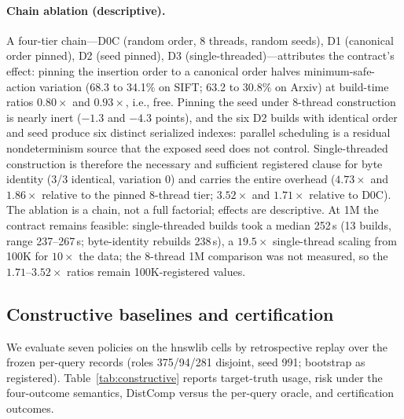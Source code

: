 \documentclass{article}
\begin{document}
\paragraph{Chain ablation (descriptive).}
A four-tier chain---D0C (random order, 8 threads, random seeds), D1 (canonical order pinned), D2 (seed
pinned), D3 (single-threaded)---attributes the contract's effect: pinning the insertion order to a
canonical order halves minimum-safe-action variation (68.3 to 34.1\% on SIFT; 63.2 to 30.8\% on Arxiv) at
build-time ratios $0.80\times$ and $0.93\times$, i.e., free. Pinning the seed under 8-thread construction is
nearly inert ($-1.3$ and $-4.3$ points), and the six D2 builds with identical order and seed produce six
distinct serialized indexes: parallel scheduling is a residual nondeterminism source that the exposed seed
does not control. Single-threaded construction is therefore the necessary and sufficient registered clause
for byte identity (3/3 identical, variation 0) and carries the entire overhead ($4.73\times$ and
$1.86\times$ relative to the pinned 8-thread tier; $3.52\times$ and $1.71\times$ relative to D0C). The
ablation is a chain, not a full factorial; effects are descriptive. At 1M the contract remains feasible:
single-threaded builds took a median 252\,s (13 builds, range 237--267\,s; byte-identity rebuilds 238\,s),
a $19.5\times$ single-thread scaling from 100K for $10\times$ the data; the 8-thread 1M comparison was
not measured, so the $1.71$--$3.52\times$ ratios remain 100K-registered values.

\subsection{Constructive baselines and certification}
\label{sec:constructive}

We evaluate seven policies on the hnswlib cells by retrospective replay over the frozen per-query records
(roles 375/94/281 disjoint, seed 991; bootstrap as registered). Table~\ref{tab:constructive} reports
target-truth usage, risk under the four-outcome semantics, DistComp versus the per-query oracle, and
certification outcomes.
\end{document}
